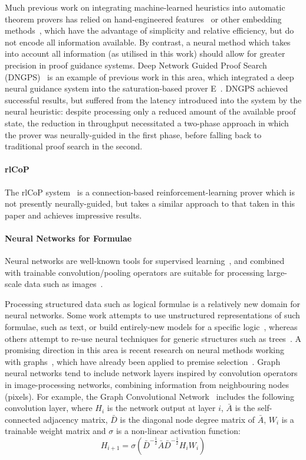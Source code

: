 \documentclass{llncs}
\begin{document}
Much previous work on integrating machine-learned heuristics into automatic theorem provers has relied on hand-engineered features~\cite{MaLeCoP,FEMaLeCoP,rlCoP} or other embedding methods~\cite{ENIGMA}, which have the advantage of simplicity and relative efficiency, but do not encode all information available.
By contrast, a neural method which takes into account all information (as utilised in this work) should allow for greater precision in proof guidance systems.
Deep Network Guided Proof Search (DNGPS)~\cite{DNGPS} is an example of previous work in this area, which integrated a deep neural guidance system into the saturation-based prover E~\cite{E}.
DNGPS achieved successful results, but suffered from the latency introduced into the system by the neural heuristic: despite processing only a reduced amount of the available proof state, the reduction in throughput necessitated a two-phase approach in which the prover was neurally-guided in the first phase, before falling back to traditional proof search in the second.

\paragraph{rlCoP} The rlCoP system~\cite{rlCoP} is a connection-based reinforcement-learning prover which is not presently neurally-guided, but takes a similar approach to that taken in this paper and achieves impressive results.

\paragraph{Neural Networks for Formulae}
Neural networks are well-known tools for supervised learning~\cite{neural-survey}, and combined with trainable convolution/pooling operators are suitable for processing large-scale data such as images~\cite{cnn}.

Processing structured data such as logical formulae is a relatively new domain for neural networks.
Some work attempts to use unstructured representations of such formulae, such as text, or build entirely-new models for a specific logic~\cite{logical-entailment}, whereas others attempt to re-use neural techniques for generic structures such as trees~\cite{logical-tree}.
A promising direction in this area is recent research on neural methods working with graphs~\cite{graph-cnn,gcn,gcn-relational}, which have already been applied to premise selection~\cite{formula-graph}.
Graph neural networks tend to include network layers inspired by convolution operators in image-processing networks, combining information from neighbouring nodes (pixels).
For example, the Graph Convolutional Network~\cite{gcn} includes the following convolution layer, where \(H_i\) is the network output at layer \(i\), \(\bar{A}\) is the self-connected adjacency matrix, \(\bar{D}\) is the diagonal node degree matrix of \(\bar{A}\), \(W_i\) is a trainable weight matrix and \(\sigma\) is a non-linear activation function:
\[
	H_{i + 1} = \sigma\left(\bar{D}^{-\frac{1}{2}}\bar{A}\bar{D}^{-\frac{1}{2}}H_iW_i\right)
\]
\end{document}
